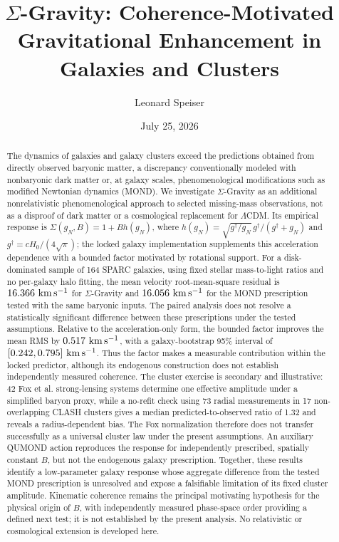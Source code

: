 \documentclass[aps,prd,reprint,superscriptaddress,showpacs,floatfix,longbibliography]{revtex4-2}
\begin{document}
\linenumbers

\title{$\Sigma$-Gravity: Coherence-Motivated Gravitational Enhancement in Galaxies and Clusters}

\author{Leonard Speiser}

\date{July 25, 2026}

\begin{abstract}
The dynamics of galaxies and galaxy clusters exceed the predictions obtained from directly observed baryonic matter, a discrepancy conventionally modeled with nonbaryonic dark matter or, at galaxy scales, phenomenological modifications such as modified Newtonian dynamics (MOND). We investigate $\Sigma$-Gravity as an additional nonrelativistic phenomenological approach to selected missing-mass observations, not as a disproof of dark matter or a cosmological replacement for $\Lambda$CDM. Its empirical response is $\Sigma(g_N,B)=1+B h(g_N)$, where $h(g_N)=\sqrt{g^\dagger/g_N}\,g^\dagger/(g^\dagger+g_N)$ and $g^\dagger=cH_0/(4\sqrt{\pi})$; the locked galaxy implementation supplements this acceleration dependence with a bounded factor motivated by rotational support. For a disk-dominated sample of 164 SPARC galaxies, using fixed stellar mass-to-light ratios and no per-galaxy halo fitting, the mean velocity root-mean-square residual is $16.366\ {\rm km\,s^{-1}}$ for $\Sigma$-Gravity and $16.056\ {\rm km\,s^{-1}}$ for the MOND prescription tested with the same baryonic inputs. The paired analysis does not resolve a statistically significant difference between these prescriptions under the tested assumptions. Relative to the acceleration-only form, the bounded factor improves the mean RMS by $0.517\ {\rm km\,s^{-1}}$, with a galaxy-bootstrap 95\% interval of $[0.242,0.795]\ {\rm km\,s^{-1}}$. Thus the factor makes a measurable contribution within the locked predictor, although its endogenous construction does not establish independently measured coherence. The cluster exercise is secondary and illustrative: 42 Fox et al. strong-lensing systems determine one effective amplitude under a simplified baryon proxy, while a no-refit check using 73 radial measurements in 17 non-overlapping CLASH clusters gives a median predicted-to-observed ratio of 1.32 and reveals a radius-dependent bias. The Fox normalization therefore does not transfer successfully as a universal cluster law under the present assumptions. An auxiliary QUMOND action reproduces the response for independently prescribed, spatially constant $B$, but not the endogenous galaxy prescription. Together, these results identify a low-parameter galaxy response whose aggregate difference from the tested MOND prescription is unresolved and expose a falsifiable limitation of its fixed cluster amplitude. Kinematic coherence remains the principal motivating hypothesis for the physical origin of $B$, with independently measured phase-space order providing a defined next test; it is not established by the present analysis. No relativistic or cosmological extension is developed here.
\end{abstract}
\end{document}
